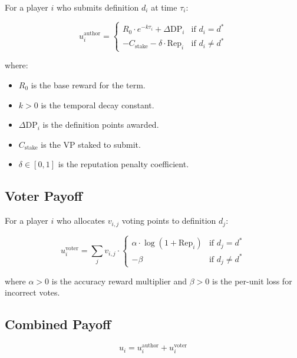 \documentclass[11pt]{article}
\begin{document}
For a player $i$ who submits definition $d_i$ at time $\tau_i$:

\begin{equation}
u_i^{\text{author}} =
\begin{cases}
  R_0 \cdot e^{-k \tau_i} + \Delta\text{DP}_i & \text{if } d_i = d^* \\[6pt]
  -C_{\text{stake}} - \delta \cdot \text{Rep}_i & \text{if } d_i \neq d^*
\end{cases}
\end{equation}

where:
\begin{itemize}[nosep]
  \item $R_0$ is the base reward for the term.
  \item $k > 0$ is the temporal decay constant.
  \item $\Delta\text{DP}_i$ is the definition points awarded.
  \item $C_{\text{stake}}$ is the VP staked to submit.
  \item $\delta \in [0, 1]$ is the reputation penalty coefficient.
\end{itemize}

\subsection{Voter Payoff}

For a player $i$ who allocates $v_{i,j}$ voting points to definition $d_j$:

\begin{equation}
u_i^{\text{voter}} = \sum_{j} v_{i,j} \cdot
\begin{cases}
  \alpha \cdot \log(1 + \text{Rep}_i) & \text{if } d_j = d^* \\[4pt]
  -\beta & \text{if } d_j \neq d^*
\end{cases}
\end{equation}

where $\alpha > 0$ is the accuracy reward multiplier and $\beta > 0$ is the per-unit loss for incorrect votes.

\subsection{Combined Payoff}

\begin{equation}
u_i = u_i^{\text{author}} + u_i^{\text{voter}}
\end{equation}

\end{document}

